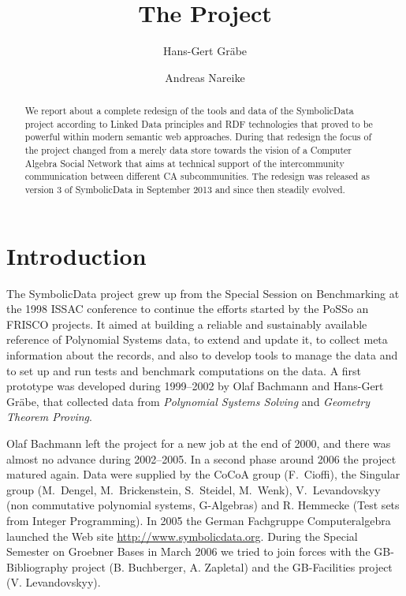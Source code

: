 \documentclass{llncs}
\title{The {\SD} Project}
\author{Hans-Gert Gr\"abe \and Andreas Nareike}
\institute{Universit\"at Leipzig, Germany\\
\email{(graebe|nareike)@informatik.uni-leipzig.de}}
\newcommand{\SD}{{\sc SymbolicData}}
\begin{document}
\maketitle

\begin{abstract}%
  We report about a complete redesign of the tools and data of the {\SD}
  project according to Linked Data principles and RDF technologies that proved
  to be powerful within modern semantic web approaches. During that redesign
  the focus of the project changed from a merely data store towards the vision
  of a Computer Algebra Social Network that aims at technical support of the
  intercommunity communication between different CA subcommunities. The
  redesign was released as version 3 of SymbolicData in September 2013 and
  since then steadily evolved.
\end{abstract}

\section{Introduction}

The SymbolicData project grew up from the Special Session on Benchmarking at
the 1998 ISSAC conference to continue the efforts started by the PoSSo
\cite{PoSSo} an FRISCO \cite{FRISCO} projects. It aimed at building a reliable
and sustainably available reference of Polynomial Systems data, to extend and
update it, to collect meta information about the records, and also to develop
tools to manage the data and to set up and run tests and benchmark
computations on the data.  A first prototype was developed during 1999--2002
by Olaf Bachmann and Hans-Gert Gr\"abe, that collected data from
\emph{Polynomial Systems Solving} and \emph{Geometry Theorem Proving}.

Olaf Bachmann left the project for a new job at the end of 2000, and there was
almost no advance during 2002--2005.  In a second phase around 2006 the
project matured again. Data were supplied by the CoCoA group (F.~Cioffi), the
Singular group (M.~Dengel, M.~Brickenstein, S.~Steidel, M.~Wenk),
V.~Levandovskyy (non commutative polynomial systems, G-Algebras) and R.
Hemmecke (Test sets from Integer Programming). In 2005 the German Fachgruppe
Computeralgebra launched the Web site \url{http://www.symbolicdata.org}.
During the Special Semester on Groebner Bases in March 2006 we tried to join
forces with the GB-Bibliography project (B. Buchberger, A. Zapletal) and the
GB-Facilities project (V. Levandovskyy).
\end{document}
